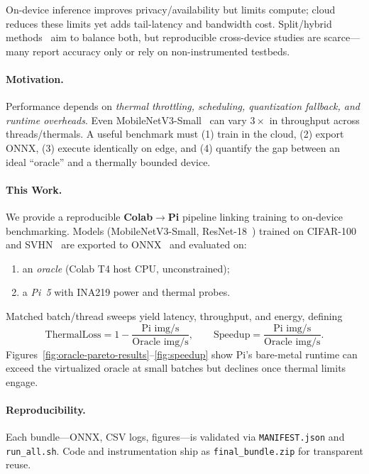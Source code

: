\documentclass{article}
\begin{document}
On-device inference improves privacy/availability but limits compute; cloud reduces these limits yet adds tail-latency and bandwidth cost. Split/hybrid methods~\cite{kang2017neurosurgeon,matsubara2022split,teerapittayanon2017distributed,hu2022dynamic} aim to balance both, but reproducible cross-device studies are scarce—many report accuracy only or rely on non-instrumented testbeds.

\paragraph{Motivation.}
Performance depends on \emph{thermal throttling, scheduling, quantization fallback, and runtime overheads}. Even MobileNetV3-Small~\cite{howard2019mobilenetv3} can vary $3\times$ in throughput across threads/thermals. A useful benchmark must (1) train in the cloud, (2) export ONNX, (3) execute identically on edge, and (4) quantify the gap between an ideal “oracle” and a thermally bounded device.

\paragraph{This Work.}
We provide a reproducible \textbf{Colab$\!\rightarrow\!$Pi} pipeline linking training to on-device benchmarking. Models (MobileNetV3-Small, ResNet-18~\cite{he2016resnet}) trained on CIFAR-100~\cite{krizhevsky2009tiny} and SVHN~\cite{netzer2011svhn} are exported to ONNX~\cite{onnxruntime_docs} and evaluated on:
\begin{enumerate}
  \item an \emph{oracle} (Colab T4 host CPU, unconstrained);
  \item a \emph{Pi~5} with INA219 power and thermal probes.
\end{enumerate}
Matched batch/thread sweeps yield latency, throughput, and energy, defining
\[
\mathrm{ThermalLoss}=1-\frac{\text{Pi img/s}}{\text{Oracle img/s}},\qquad 
\mathrm{Speedup}=\frac{\text{Pi img/s}}{\text{Oracle img/s}}.
\]
Figures~\ref{fig:oracle-pareto-results}–\ref{fig:speedup} show Pi’s bare-metal runtime can exceed the virtualized oracle at small batches but declines once thermal limits engage.

\paragraph{Reproducibility.}
Each bundle—ONNX, CSV logs, figures—is validated via \texttt{MANIFEST.json} and \texttt{run\_all.sh}. Code and instrumentation ship as \texttt{final\_bundle.zip} for transparent reuse.
\end{document}
